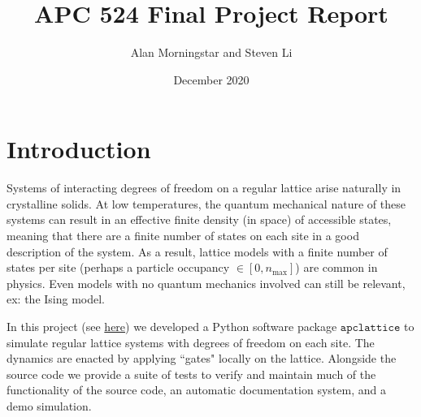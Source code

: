\documentclass{article}
\title{APC 524 Final Project Report}
\author{Alan Morningstar and Steven Li}
\date{December 2020}
\begin{document}
\maketitle

\section{Introduction}

Systems of interacting degrees of freedom on a regular lattice arise naturally in crystalline solids. At low temperatures, the quantum mechanical nature of these systems can result in an effective finite density (in space) of accessible states, meaning that there are a finite number of states on each site in a good description of the system. As a result, lattice models with a finite number of states per site (perhaps a particle occupancy $\in [0, n_\mathrm{max}]$) are common in physics. Even models with no quantum mechanics involved can still be relevant, ex: the Ising model.

In this project (see \href{http://www.github.com/aormorningstar/apclattice}{here}) we developed a Python software package $\texttt{apclattice}$ to simulate regular lattice systems with degrees of freedom on each site. The dynamics are enacted by applying ``gates" locally on the lattice. Alongside the source code we provide a suite of tests to verify and maintain much of the functionality of the source code, an automatic documentation system, and a demo simulation.
\end{document}
